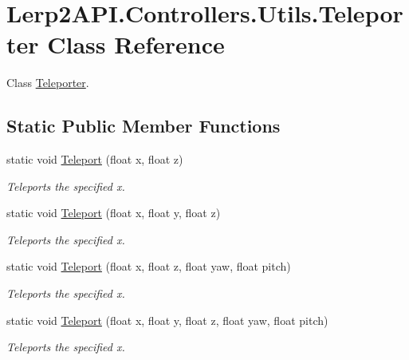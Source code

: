 \hypertarget{class_lerp2_a_p_i_1_1_controllers_1_1_utils_1_1_teleporter}{}\section{Lerp2\+A\+P\+I.\+Controllers.\+Utils.\+Teleporter Class Reference}
\label{class_lerp2_a_p_i_1_1_controllers_1_1_utils_1_1_teleporter}


Class \hyperlink{class_lerp2_a_p_i_1_1_controllers_1_1_utils_1_1_teleporter}{Teleporter}.  


\subsection*{Static Public Member Functions}
\begin{DoxyCompactItemize}
\item 
static void \hyperlink{class_lerp2_a_p_i_1_1_controllers_1_1_utils_1_1_teleporter_a9129719b3960fdf32fc23c959b6e6011}{Teleport} (float x, float z)
\begin{DoxyCompactList}\small\item\em Teleports the specified x. \end{DoxyCompactList}\item 
static void \hyperlink{class_lerp2_a_p_i_1_1_controllers_1_1_utils_1_1_teleporter_aa29a067a3c1f0f0c870baa8525b59252}{Teleport} (float x, float y, float z)
\begin{DoxyCompactList}\small\item\em Teleports the specified x. \end{DoxyCompactList}\item 
static void \hyperlink{class_lerp2_a_p_i_1_1_controllers_1_1_utils_1_1_teleporter_ac6ef87a99fe92235f0e0a60ceb5425a8}{Teleport} (float x, float z, float yaw, float pitch)
\begin{DoxyCompactList}\small\item\em Teleports the specified x. \end{DoxyCompactList}\item 
static void \hyperlink{class_lerp2_a_p_i_1_1_controllers_1_1_utils_1_1_teleporter_a5c2278372f1b2f82b94cbd38d5857db1}{Teleport} (float x, float y, float z, float yaw, float pitch)
\begin{DoxyCompactList}\small\item\em Teleports the specified x. \end{DoxyCompactList}\end{DoxyCompactItemize}


